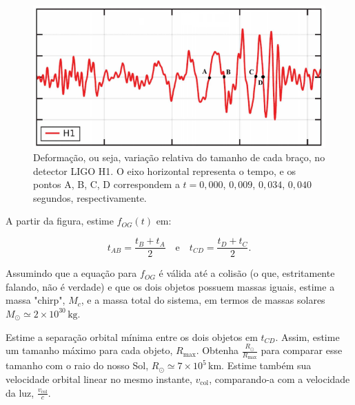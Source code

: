 \documentclass[11pt]{article}
\begin{document}
\begin{pproblem}
\begin{alternativas}
    \begin{figure}[H]
        \centering
        \includegraphics[width=0.7\linewidth]{imagens/grafico OG 1.png}
        \caption{Deformação, ou seja, variação relativa do tamanho de cada braço, no detector LIGO H1. O eixo horizontal representa o tempo, e os pontos A, B, C, D correspondem a \(t = 0,000\), \(0,009\), \(0,034\), \(0,040\) segundos, respectivamente.}
    \end{figure}

    \item A partir da figura, estime \( f_{OG}(t) \) em:

    \[
    t_{AB} = \frac{t_B + t_A}{2} \quad \text{e} \quad t_{CD} = \frac{t_D + t_C}{2}.
    \]
    
    Assumindo que a equação para \(f_{OG}\) é válida até a colisão (o que, estritamente falando, não é verdade) e que os dois objetos possuem massas iguais, estime a massa "chirp", \( M_c \), e a massa total do sistema, em termos de massas solares \( M_\odot \simeq 2 \times 10^{30} \, \text{kg}\).

    \item Estime a separação orbital mínima entre os dois objetos em \( t_{CD} \). 
    Assim, estime um tamanho máximo para cada objeto, \( R_{\text{max}} \). 
    Obtenha \( \frac{R_\odot}{R_{\text{max}}} \) para comparar esse tamanho com o raio do nosso Sol, \( R_\odot \simeq 7 \times 10^5 \, \text{km} \). 
    Estime também sua velocidade orbital linear no mesmo instante, \( v_{\text{col}} \), comparando-a com a velocidade da luz, \( \frac{v_{\text{col}}}{c} \).
\end{alternativas}


\end{pproblem}
\end{document}
